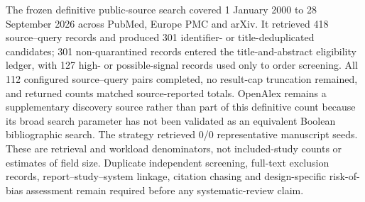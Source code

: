The frozen definitive public-source search covered 1 January 2000 to 28 September 2026 across PubMed, Europe PMC and arXiv. It retrieved 418 source--query records and produced 301 identifier- or title-deduplicated candidates; 301 non-quarantined records entered the title-and-abstract eligibility ledger, with 127 high- or possible-signal records used only to order screening. All 112 configured source--query pairs completed, no result-cap truncation remained, and returned counts matched source-reported totals. OpenAlex remains a supplementary discovery source rather than part of this definitive count because its broad search parameter has not been validated as an equivalent Boolean bibliographic search. The strategy retrieved 0/0 representative manuscript seeds. These are retrieval and workload denominators, not included-study counts or estimates of field size. Duplicate independent screening, full-text exclusion records, report--study--system linkage, citation chasing and design-specific risk-of-bias assessment remain required before any systematic-review claim.
